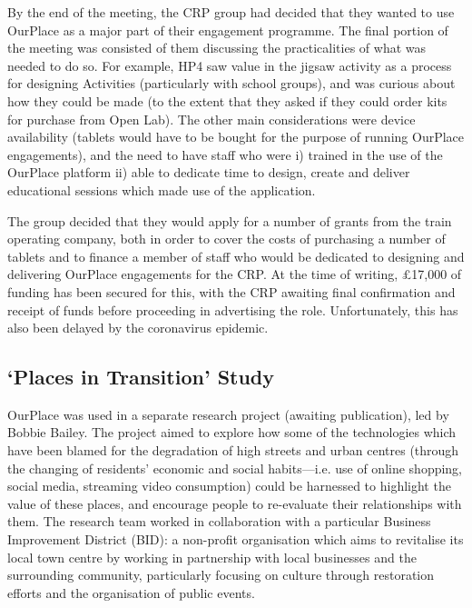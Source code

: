 By the end of the meeting, the CRP group had decided that they wanted to use OurPlace as a major part of their engagement programme. The final portion of the meeting was consisted of them discussing the practicalities of what was needed to do so. For example, HP4 saw value in the jigsaw activity as a process for designing Activities (particularly with school groups), and was curious about how they could be made (to the extent that they asked if they could order kits for purchase from Open Lab). The other main considerations were device availability (tablets would have to be bought for the purpose of running OurPlace engagements), and the need to have staff who were i) trained in the use of the OurPlace platform ii) able to dedicate time to design, create and deliver educational sessions which made use of the application.

The group decided that they would apply for a number of grants from the train operating company, both in order to cover the costs of purchasing a number of tablets and to finance a member of staff who would be dedicated to designing and delivering OurPlace engagements for the CRP. At the time of writing, £17,000 of funding has been secured for this, with the CRP awaiting final confirmation and receipt of funds before proceeding in advertising the role. Unfortunately, this has also been delayed by the coronavirus epidemic.

\subsection{`Places in Transition' Study}

OurPlace was used in a separate research project (awaiting publication), led by Bobbie Bailey. The project aimed to explore how some of the technologies which have been blamed for the degradation of high streets and urban centres (through the changing of residents' economic and social habits---i.e. use of online shopping, social media, streaming video consumption) could be harnessed to highlight the value of these places, and encourage people to re-evaluate their relationships with them. The research team worked in collaboration with a particular Business Improvement District (BID): a non-profit organisation which aims to revitalise its local town centre by working in partnership with local businesses and the surrounding community, particularly focusing on culture through restoration efforts and the organisation of public events.

